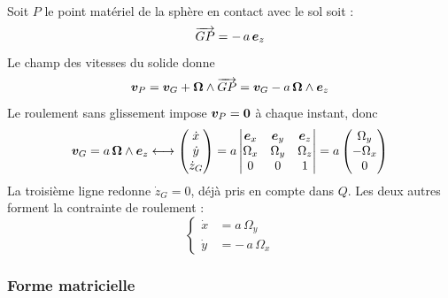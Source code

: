 Soit $P$ le point matériel de la sphère en contact avec le sol soit : 
\[
    \overrightarrow{GP} = -\,a\,\bm{e}_z
\]
Le champ des vitesses du solide donne
\[
    \bm{v}_P = \bm{v}_G + \bm{\Omega}\wedge\overrightarrow{GP}
    = \bm{v}_G - a\,\bm{\Omega}\wedge\bm{e}_z
\]
Le roulement sans glissement impose $\bm{v}_P = \bm{0}$ à chaque
instant, donc
\[
    \bm{v}_G = a\,\bm{\Omega}\wedge\bm{e}_z
    \longleftrightarrow
    \begin{pmatrix}
        \dot x\\ \dot y\\ \dot z_G
    \end{pmatrix}
    = a\begin{vmatrix}
        \bm{e}_x & \bm{e}_y & \bm{e}_z\\
        \Omega_x & \Omega_y & \Omega_z\\
        0 & 0 & 1
    \end{vmatrix}
    = a\begin{pmatrix}
        \Omega_y\\ -\Omega_x\\ 0
    \end{pmatrix}
\]
La troisième ligne redonne $\dot z_G = 0$, déjà pris en compte dans
$Q$. Les deux autres forment la contrainte de roulement :
\[
    \left\{
    \begin{aligned}
        \dot x &= a\,\Omega_y\\
        \dot y &= -\,a\,\Omega_x
    \end{aligned}
    \right.
\]


\subsubsection{Forme matricielle}

